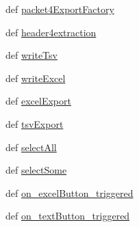 \begin{DoxyCompactItemize}
\item 
def \hyperlink{classmmasgis_1_1risultati_1_1testDialog_a7e99fc92f68e06d5486b8dec9d453d21}{packet4ExportFactory}
\item 
def \hyperlink{classmmasgis_1_1risultati_1_1testDialog_a23f368a2b73fb93cb54a9c2eea1a3929}{header4extraction}
\item 
def \hyperlink{classmmasgis_1_1risultati_1_1testDialog_a7cea750aa2b3b419fc9f5295cb16eb94}{writeTsv}
\item 
def \hyperlink{classmmasgis_1_1risultati_1_1testDialog_aabd1fa1fa38d0bebecb3476094df1539}{writeExcel}
\item 
def \hyperlink{classmmasgis_1_1risultati_1_1testDialog_a9045c1e295482017d4ccfe447b2b33b3}{excelExport}
\item 
def \hyperlink{classmmasgis_1_1risultati_1_1testDialog_a20ccbdb53b70c71a9c1ab5dbb017326c}{tsvExport}
\item 
def \hyperlink{classmmasgis_1_1risultati_1_1testDialog_adee2c09c73d33b36b32f588b87eb746c}{selectAll}
\item 
def \hyperlink{classmmasgis_1_1risultati_1_1testDialog_ae6081e40da5c53850e7fd42412a32dda}{selectSome}
\item 
def \hyperlink{classmmasgis_1_1risultati_1_1testDialog_adc6af8de409627a1adce232db763be9c}{on\_\-excelButton\_\-triggered}
\item 
def \hyperlink{classmmasgis_1_1risultati_1_1testDialog_a2cd0df44803b2a44bff86a9a9364f3eb}{on\_\-textButton\_\-triggered}
\end{DoxyCompactItemize}
